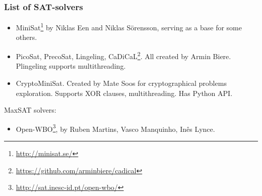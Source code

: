\subsubsection{List of SAT-solvers}


\begin{itemize}

\item MiniSat\footnote{\url{http://minisat.se/}} by Niklas Een and Niklas Sörensson, serving as a base for some others.

\item PicoSat, PrecoSat, Lingeling, CaDiCaL\footnote{\url{https://github.com/arminbiere/cadical}}.
All created by Armin Biere. Plingeling supports multithreading.

\item CryptoMiniSat. Created by Mate Soos for cryptographical problems exploration.
Supports XOR clauses, multithreading.
Has Python API.

\end{itemize}

MaxSAT solvers:

\begin{itemize}

\item Open-WBO\footnote{\url{http://sat.inesc-id.pt/open-wbo/}}, by Ruben Martins, Vasco Manquinho, Inês Lynce.

\end{itemize}

